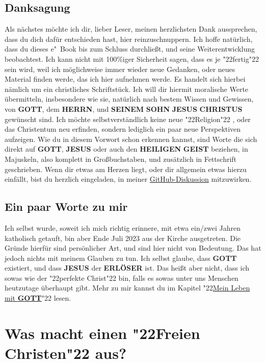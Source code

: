 \documentclass[12pt,a4paper]{article}
\newcommand{\Christus}[0]{\textbf{CHRISTUS}}
\newcommand{\Erloeser}[0]{\textbf{ERL\"OSER}}
\newcommand{\Geist}[0]{\textbf{GEIST}}
\newcommand{\Gott}[0]{\textbf{GOTT}}
\newcommand{\Heiligen}[0]{\textbf{HEILIGEN}}
\newcommand{\Herrn}[0]{\textbf{HERRN}}
\newcommand{\Jesus}[0]{\textbf{JESUS}}
\newcommand{\Seinem}[0]{\textbf{SEINEM}}
\newcommand{\Sohn}[0]{\textbf{SOHN}}
\newcommand{\q}[1]{\char"22{#1}\char"22 }
\begin{document}
	\subsection{Danksagung}
		Als n\"achstes m\"ochte ich dir,
		lieber Leser,
		meinen herzlichsten Dank aussprechen,
		dass du dich daf\"ur entschieden hast,
		hier reinzuschnuppern.
		Ich hoffe nat\"urlich,
		dass du dieses e"~Book bis zum Schluss durchlie{\ss}t,
		und seine Weiterentwicklung beobachtest.
		Ich kann nicht mit 100\%iger Sicherheit sagen,
		dass es je \q{fertig} sein wird,
		weil ich m\"oglichweise immer wieder neue Gedanken,
		oder neues Material finden werde,
		das ich hier aufnehmen werde.			
		Es handelt sich hierbei n\"amlich um ein christliches Schriftst\"uck.
		Ich will dir hiermit moralische Werte \"ubermitteln,
		insbesondere wie sie,
		nat\"urlich nach bestem Wissen und Gewissen,
		von {\Gott},
		dem {\Herrn},
		und {\Seinem} {\Sohn} {\Jesus} {\Christus} gew\"unscht sind.
		Ich m\"ochte selbstverst\"andlich keine neue \q{Religion},
		oder das Christentum neu erfinden,
		sondern lediglich ein paar neue Perspektiven aufzeigen.
		Wie du in diesem Vorwort schon erkennen kannst,
		sind Worte die sich direkt auf {\Gott},
		{\Jesus} oder auch den {\Heiligen} {\Geist} beziehen,
		in Majuskeln,
		also komplett in Gro{\ss}buchstaben,
		und zus\"atzlich in Fettschrift geschrieben.
		Wenn dir etwas am Herzen liegt,
		oder dir allgemein etwas hierzu einf\"allt,
		bist du herzlich eingeladen,
		in meiner \href{https://github.com/DerRobert-28/Der-Freie-Christ/discussions}{GitHub-Diskussion} mitzuwirken.
	
	\subsection{Ein paar Worte zu mir}
		Ich selbst wurde,
		soweit ich mich richtig erinnere,
		mit etwa ein/zwei Jahren katholisch getauft,
		bin aber Ende Juli 2023 aus der Kirche ausgetreten.
		Die Gr\"unde hierf\"ur sind pers\"onlicher Art,
		und sind hier nicht von Bedeutung.
		Das hat jedoch nichts mit meinem Glauben zu tun.
		Ich selbst glaube,
		dass {\Gott} existiert,
		und dass {\Jesus} der {\Erloeser} ist.
		Das hei{\ss}t aber nicht,
		dass ich sowas wie der \q{perfekte Christ} bin,
		falls es sowas unter uns Menschen heutzutage \"uberhaupt gibt.
		Mehr zu mir kannst du im Kapitel \q{\hyperref[MeinLebenMitGott]{Mein Leben mit {\Gott}}} lesen.
	
	\newpage
	\section{Was macht einen \q{Freien Christen} aus?}
	
\end{document}
